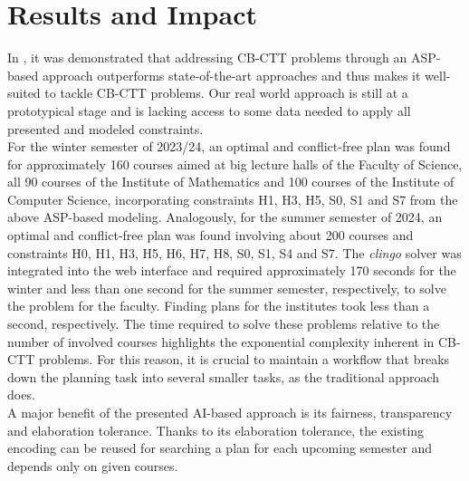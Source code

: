 \documentclass{easychair}
\newcommand{\CBCTT}{CB-CTT}
\newcommand{\ASP}{ASP}
\newcommand{\clingo}{\textit{clingo}}
\begin{document}
\section{Results and Impact}
\label{sec:impact}
  In \cite{bainkaokscsotawa18a}, it was demonstrated that addressing \CBCTT{} problems through an \ASP{}-based approach outperforms state-of-the-art approaches and thus makes it well-suited to tackle \CBCTT{} problems. 
  Our real world approach is still at a prototypical stage and is lacking access to some data needed to apply all presented and modeled constraints. \\
  For the winter semester of 2023/24, an optimal and conflict-free plan was found for approximately 160 courses aimed at big lecture halls of the Faculty of Science, all 90 courses of the Institute of Mathematics and 100 courses of the Institute of Computer Science, incorporating constraints H1, H3, H5, S0, S1 and S7 from the above \ASP{}-based modeling. 
  Analogously, for the summer semester of 2024, an optimal and conflict-free plan was found involving about 200 courses and constraints H0, H1, H3, H5, H6, H7, H8, S0, S1, S4 and S7.  
  The \clingo{} solver was integrated into the web interface and required approximately  170 seconds for the winter and less than one second for the summer semester, respectively, to solve the problem for the faculty. 
  Finding plans for the institutes took less than a second, respectively. 
  The time required to solve these problems relative to the number of involved courses highlights the exponential complexity inherent in \CBCTT{} problems. 
  For this reason, it is crucial to maintain a workflow that breaks down the planning task into several smaller tasks, as the traditional approach does. \\
  A major benefit of the presented AI-based approach is its fairness, transparency and elaboration tolerance. 
  Thanks to its elaboration tolerance, the existing encoding can be reused for searching a plan for each upcoming semester and depends only on given courses. 
\end{document}
